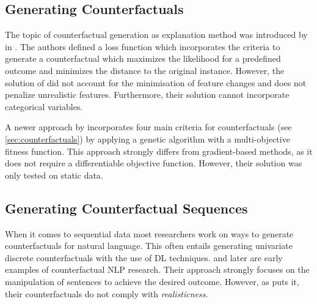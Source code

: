 \documentclass[./../../paper.tex]{subfiles}
\begin{document}
\subsection{Generating Counterfactuals}
The topic of counterfactual generation as explanation method was introduced by \citeauthor{wachter_CounterfactualExplanationsOpening_2018} in \citeyear{wachter_CounterfactualExplanationsOpening_2018}\autocite{wachter_CounterfactualExplanationsOpening_2018}. The authors defined a loss function which incorporates the criteria to generate a counterfactual which maximizes the likelihood for a predefined outcome and minimizes the distance to the original instance. However, the solution of \citeauthor{wachter_CounterfactualExplanationsOpening_2018} did not account for the minimisation of feature changes and does not penalize unrealistic features. Furthermore, their solution cannot incorporate categorical variables.

A newer approach by \citeauthor{dandl_MultiObjectiveCounterfactualExplanations_2020} incorporates four main criteria for counterfactuals (see \autoref{sec:counterfactuals}) by applying a genetic algorithm with a multi-objective fitness function\autocite{dandl_MultiObjectiveCounterfactualExplanations_2020}. This approach strongly differs from gradient-based methods, as it does not require a differentiable objective function. However, their solution was only tested on static data.

\subsection{Generating Counterfactual Sequences}
When it comes to sequential data most researchers work on ways to generate counterfactuals for natural language. This often entails generating univariate discrete counterfactuals with the use of \gls{DL} techniques. \citeauthor{martens_Explainingdatadrivendocument_2014} and later \citeauthor{krause_InteractingPredictionsVisual_2016} are early examples of counterfactual NLP research\autocites{martens_Explainingdatadrivendocument_2014,krause_InteractingPredictionsVisual_2016}. Their approach strongly focuses on the manipulation of sentences to achieve the desired outcome. However, as \citeauthor{robeer_GeneratingRealisticNatural_2021} puts it, their counterfactuals do not comply with \emph{realisticness}\autocite{robeer_GeneratingRealisticNatural_2021}.
\end{document}
